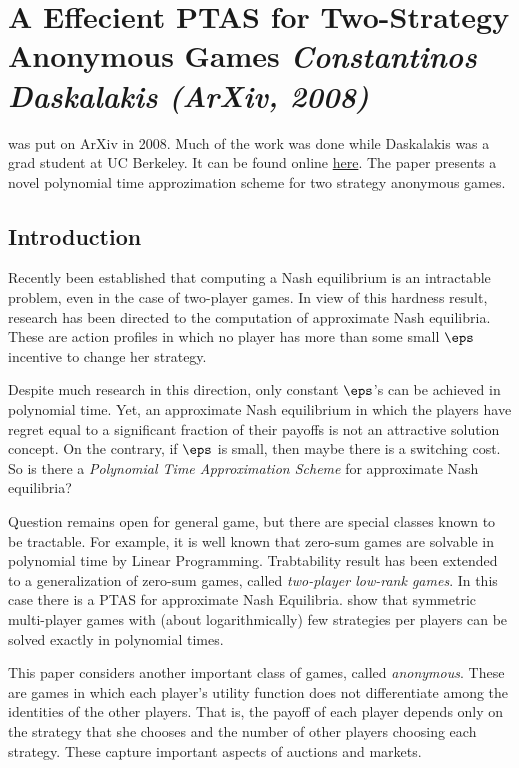 
\newpage
\section{A Effecient PTAS for Two-Strategy Anonymous Games \textit{\small Constantinos Daskalakis (ArXiv, 2008)}}

\citet{D-2008} was put on ArXiv in 2008. Much of the work was done while Daskalakis was a grad student at UC Berkeley. It can be found online \href{https://arxiv.org/abs/0812.2277}{here}. The paper presents a novel polynomial time approzimation scheme for two strategy anonymous games. 

\subsection{Introduction}

Recently been established that computing a Nash equilibrium is an intractable problem, even in the case of two-player games. In view of this hardness result, research has been directed to the computation of approximate Nash equilibria. These are action profiles in which no player has more than some small $\eps$ incentive to change her strategy. 

Despite much research in this direction, only constant $\eps$'s can be achieved in polynomial time. Yet, an approximate Nash equilibrium in which the players have regret equal to a significant fraction of their payoffs is not an attractive solution concept. On the contrary, if $\eps$ is small, then maybe there is a switching cost. So is there a \emph{Polynomial Time Approximation Scheme} for approximate Nash equilibria?

Question remains open for general game, but there are special classes known to be tractable. For example, it is well known that zero-sum games are solvable in polynomial time by Linear Programming. Trabtability result has been extended to a generalization of zero-sum games, called \emph{two-player low-rank games}. In this case there is a PTAS for approximate Nash Equilibria. \citet{PR-2005} show that symmetric multi-player games with (about logarithmically) few strategies per players can be solved exactly in polynomial times. 

This paper considers another important class of games, called \emph{anonymous}. These are games in which each player's utility function does not differentiate among the identities of the other players. That is, the payoff of each player depends only on the strategy that she chooses and the number of other players choosing each strategy. These capture important aspects of auctions and markets.

